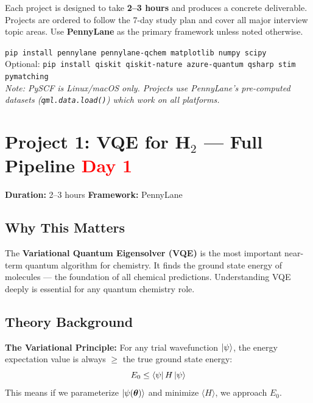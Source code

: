 \documentclass[11pt,a4paper]{article}
\begin{document}
Each project is designed to take \textbf{2--3 hours} and produces a concrete deliverable. Projects are ordered to follow the 7-day study plan and cover all major interview topic areas. Use \textbf{PennyLane} as the primary framework unless noted otherwise.

\begin{importantbox}[Setup]
\texttt{pip install pennylane pennylane-qchem matplotlib numpy scipy}\\
Optional: \texttt{pip install qiskit qiskit-nature azure-quantum qsharp stim pymatching}\\
\textit{Note: PySCF is Linux/macOS only. Projects use PennyLane's pre-computed datasets (\texttt{qml.data.load()}) which work on all platforms.}
\end{importantbox}

\section{Project 1: VQE for H\texorpdfstring{$_2$}{2} --- Full Pipeline \hfill \textcolor{red}{\textbf{Day 1}}}

\begin{questionbox}
\textbf{Duration:} 2--3 hours \quad \textbf{Framework:} PennyLane
\end{questionbox}

\subsection*{Why This Matters}
The \textbf{Variational Quantum Eigensolver (VQE)} is the most important near-term quantum algorithm for chemistry. It finds the ground state energy of molecules --- the foundation of all chemical predictions. Understanding VQE deeply is essential for any quantum chemistry role.

\subsection*{Theory Background}
\textbf{The Variational Principle:} For any trial wavefunction $\ket{\psi}$, the energy expectation value is always $\geq$ the true ground state energy:
\[
E_0 \leq \bra{\psi} H \ket{\psi}
\]
This means if we parameterize $\ket{\psi(\boldsymbol{\theta})}$ and minimize $\langle H \rangle$, we approach $E_0$.
\end{document}
